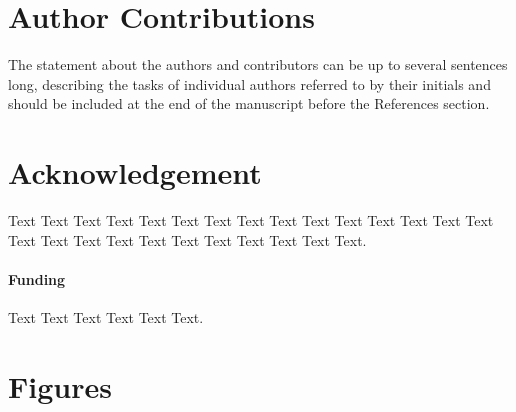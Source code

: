 \documentclass{frontiersSCNS} %
\begin{document}
\section*{Author Contributions}

The statement about the authors and contributors can be up to several sentences long, describing the tasks of individual authors referred to by their initials and should be included at the end of the manuscript before the References section.


\section*{Acknowledgement}
Text Text Text Text Text Text  Text Text Text Text Text Text Text Text  Text Text Text Text Text Text Text Text Text  Text Text Text.

\paragraph{Funding\textcolon} Text Text Text Text  Text Text.



\section*{Figures}

\end{document}
